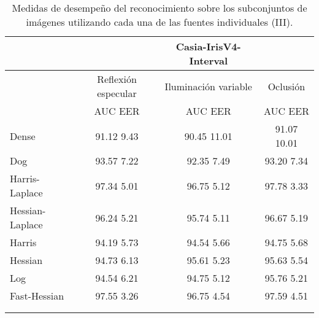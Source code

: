 \begin{table}[h]
\begin{center}
\begin{tabular}{@{}lccc@{}}
\toprule
&& Casia-IrisV4-Interval & \\ \hline
&Reflexión especular		&  	Iluminación variable		& Oclusión \\ \hline
&AUC  \phantom{aa} EER  &  	AUC  \phantom{aa} EER 	& AUC  \phantom{aa} EER  \\ \hline
Dense& 91.12 \phantom{aa} 9.43   &  	90.45 \phantom{aa} 11.01  & 91.07 \phantom{aa} 10.01  \\
Dog& 93.57 \phantom{aa} 7.22   &  	92.35 \phantom{aa} 7.49  & 93.20 \phantom{aa} 7.34  \\
Harris-Laplace& 97.34 \phantom{aa} 5.01   &  	96.75 \phantom{aa} 5.12  & 97.78 \phantom{aa} 3.33  \\
Hessian-Laplace& 96.24 \phantom{aa} 5.21   &  95.74 \phantom{aa} 5.11 & 96.67 \phantom{aa} 5.19  \\
Harris& 94.19  \phantom{aa}5.73  &  	94.54 \phantom{aa} 5.66  & 94.75  \phantom{aa}5.68  \\
Hessian& 94.73 \phantom{aa} 6.13   &  95.61 \phantom{aa} 5.23  & 95.63 \phantom{aa} 5.54  \\
Log& 94.54 \phantom{aa} 6.21  &  94.75  \phantom{aa}5.12 & 95.76 \phantom{aa} 5.21   \\ 
Fast-Hessian& 97.55 \phantom{aa} 3.26   &  	96.75 \phantom{aa} 4.54  & 97.59 \phantom{aa} 4.51  \\  \\  \\ 

\end{tabular}
\end{center}
\caption{Medidas de desempeño del reconocimiento sobre los subconjuntos de imágenes utilizando cada una de las fuentes individuales (III).}
\label{my_tabla}
\end{table} 

\newpage

